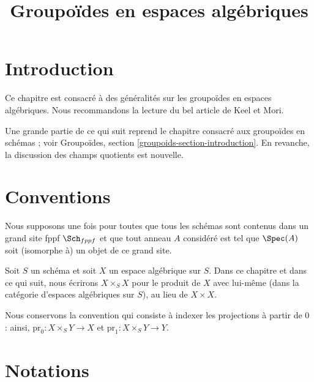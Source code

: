 

%


\title{Groupoïdes en espaces algébriques}


\maketitle

\label{section-phantom}

\tableofcontents

\section{Introduction}
\label{section-introduction}

\noindent
Ce chapitre est consacré à des généralités sur les groupoïdes en espaces algébriques. Nous recommandons la lecture du bel article \cite{K-M} de Keel et Mori.

\medskip\noindent
Une grande partie de ce qui suit reprend le chapitre consacré aux groupoïdes en schémas ; voir Groupoïdes, section \ref{groupoids-section-introduction}. En revanche, la discussion des champs quotients est nouvelle.


\section{Conventions}
\label{section-conventions}

\noindent
Nous supposons une fois pour toutes que tous les schémas sont contenus dans un grand site fppf $\Sch_{fppf}$ et que tout anneau $A$ considéré est tel que $\Spec(A)$ soit (isomorphe à) un objet de ce grand site.

\medskip\noindent
Soit $S$ un schéma et soit $X$ un espace algébrique sur $S$. Dans ce chapitre et dans ce qui suit, nous écrirons $X \times_S X$ pour le produit de $X$ avec lui-même (dans la catégorie d'espaces algébriques sur $S$), au lieu de $X \times X$.

\medskip\noindent
Nous conservons la convention qui consiste à indexer les projections à partir de $0$ : ainsi, $\text{pr}_0 : X \times_S Y \to X$ et $\text{pr}_1 : X \times_S Y \to Y$.




\section{Notations}
\label{section-notation}

